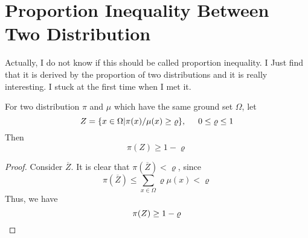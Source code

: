 \section{Proportion Inequality Between Two Distribution}
Actually, I do not know if this should be called proportion inequality.
I Just find that it is derived by the proportion of two distributions and it is really interesting.
I stuck at the first time when I met it.
\begin{lemma}
  For two distribution $\pi$ and $\mu$ which have the same ground set $\Omega$,
  let
  \[Z = \{x\in \Omega | \pi(x)/\mu(x) \geq \varrho\}, \hspace{0.5cm} 0 \leq \varrho \leq 1\]
  Then
  \[\pi(Z) \geq 1 - \varrho\]
\end{lemma}
\begin{proof}
  Consider $\overline{Z}$.
  It is clear that $\pi(\overline{Z}) < \varrho$, since
  \[\pi(\overline{Z})  \leq \sum_{x\in\Omega} \varrho\mu(x) < \varrho\]
  Thus, we have
  \[\pi(Z) \geq 1 - \varrho \qedhere\]
\end{proof}

